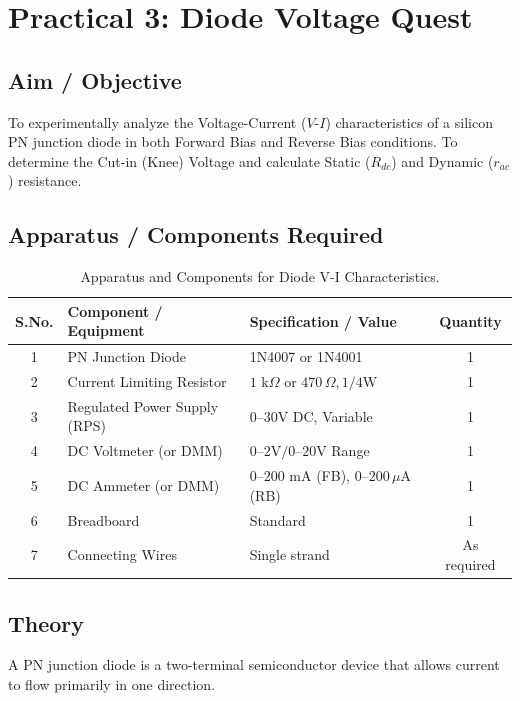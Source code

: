 \chapter{Practical 3: Diode Voltage Quest}

\section{Aim / Objective}
To experimentally analyze the Voltage-Current ($V$-$I$) characteristics of a silicon PN junction diode in both Forward Bias and Reverse Bias conditions. To determine the Cut-in (Knee) Voltage and calculate Static ($R_{dc}$) and Dynamic ($r_{ac}$) resistance.

\section{Apparatus / Components Required}

\begin{table}[htbp]
\centering
\small
\begin{tabularx}{\textwidth}{c l X c}
\toprule
\textbf{S.No.} & \textbf{Component / Equipment} & \textbf{Specification / Value} & \textbf{Quantity} \\
\midrule
1 & PN Junction Diode & 1N4007 or 1N4001 & 1 \\
2 & Current Limiting Resistor & $1\text{ k}\Omega$ or $470\,\Omega, 1/4\text{W}$ & 1 \\
3 & Regulated Power Supply (RPS) & $0\text{--}30\text{V DC}$, Variable & 1 \\
4 & DC Voltmeter (or DMM) & $0\text{--}2\text{V} / 0\text{--}20\text{V}$ Range & 1 \\
5 & DC Ammeter (or DMM) & $0\text{--}200\text{ mA}$ (FB), $0\text{--}200\,\mu\text{A}$ (RB) & 1 \\
6 & Breadboard & Standard & 1 \\
7 & Connecting Wires & Single strand & As required \\
\bottomrule
\end{tabularx}
\caption{Apparatus and Components for Diode V-I Characteristics.}
\label{tab:diode-apparatus}
\end{table}

\section{Theory}

A PN junction diode is a two-terminal semiconductor device that allows current to flow primarily in one direction.

